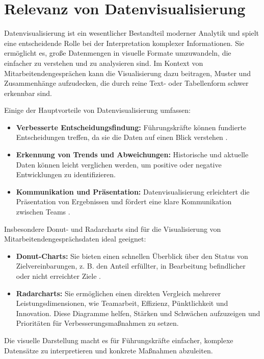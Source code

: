 \section{Relevanz von Datenvisualisierung}
Datenvisualisierung ist ein wesentlicher Bestandteil moderner Analytik und spielt eine entscheidende Rolle bei der Interpretation komplexer Informationen. Sie ermöglicht es, große Datenmengen in visuelle Formate umzuwandeln, die einfacher zu verstehen und zu analysieren sind. Im Kontext von Mitarbeitendengesprächen kann die Visualisierung dazu beitragen, Muster und Zusammenhänge aufzudecken, die durch reine Text- oder Tabellenform schwer erkennbar sind.

Einige der Hauptvorteile von Datenvisualisierung umfassen:
\begin{itemize}
    \item \textbf{Verbesserte Entscheidungsfindung:} Führungskräfte können fundierte Entscheidungen treffen, da sie die Daten auf einen Blick verstehen \cite{kirk2016data}.
    \item \textbf{Erkennung von Trends und Abweichungen:} Historische und aktuelle Daten können leicht verglichen werden, um positive oder negative Entwicklungen zu identifizieren.
    \item \textbf{Kommunikation und Präsentation:} Datenvisualisierung erleichtert die Präsentation von Ergebnissen und fördert eine klare Kommunikation zwischen Teams \cite{ware2012information}.
\end{itemize}

Insbesondere Donut- und Radarcharts sind für die Visualisierung von Mitarbeitendengesprächsdaten ideal geeignet:
\begin{itemize}
    \item \textbf{Donut-Charts:} Sie bieten einen schnellen Überblick über den Status von Zielvereinbarungen, z. B. den Anteil erfüllter, in Bearbeitung befindlicher oder nicht erreichter Ziele \cite{evergreen2016effective}.
    \item \textbf{Radarcharts:} Sie ermöglichen einen direkten Vergleich mehrerer Leistungsdimensionen, wie Teamarbeit, Effizienz, Pünktlichkeit und Innovation. Diese Diagramme helfen, Stärken und Schwächen aufzuzeigen und Prioritäten für Verbesserungsmaßnahmen zu setzen.
\end{itemize}

Die visuelle Darstellung macht es für Führungskräfte einfacher, komplexe Datensätze zu interpretieren und konkrete Maßnahmen abzuleiten.

